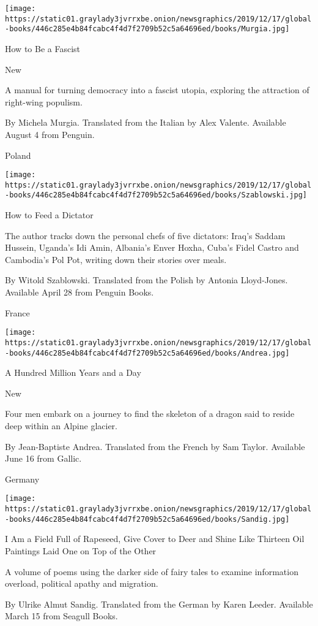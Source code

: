 \texttt{[image: https://static01.graylady3jvrrxbe.onion/newsgraphics/2019/12/17/global-books/446c285e4b84fcabc4f4d7f2709b52c5a64696ed/books/Murgia.jpg]}

How to Be a Fascist

New

A manual for turning democracy into a fascist utopia, exploring the
attraction of right-wing populism.

 By Michela Murgia. Translated from the Italian by Alex Valente.
Available August 4 from Penguin.

Poland

\texttt{[image: https://static01.graylady3jvrrxbe.onion/newsgraphics/2019/12/17/global-books/446c285e4b84fcabc4f4d7f2709b52c5a64696ed/books/Szablowski.jpg]}

How to Feed a Dictator

The author tracks down the personal chefs of five dictators: Iraq's
Saddam Hussein, Uganda's Idi Amin, Albania's Enver Hoxha, Cuba's Fidel
Castro and Cambodia's Pol Pot, writing down their stories over meals.

 By Witold Szablowski. Translated from the Polish by Antonia
Lloyd-Jones. Available April 28 from Penguin Books.

France

\texttt{[image: https://static01.graylady3jvrrxbe.onion/newsgraphics/2019/12/17/global-books/446c285e4b84fcabc4f4d7f2709b52c5a64696ed/books/Andrea.jpg]}

A Hundred Million Years and a Day

New

Four men embark on a journey to find the skeleton of a dragon said to
reside deep within an Alpine glacier.

 By Jean-Baptiste Andrea. Translated from the French by Sam Taylor.
Available June 16 from Gallic.

Germany

\texttt{[image: https://static01.graylady3jvrrxbe.onion/newsgraphics/2019/12/17/global-books/446c285e4b84fcabc4f4d7f2709b52c5a64696ed/books/Sandig.jpg]}

I Am a Field Full of Rapeseed, Give Cover to Deer and Shine Like
Thirteen Oil Paintings Laid One on Top of the Other

A volume of poems using the darker side of fairy tales to examine
information overload, political apathy and migration.

 By Ulrike Almut Sandig. Translated from the German by Karen Leeder.
Available March 15 from Seagull Books.


